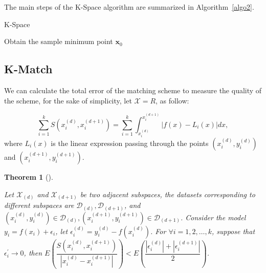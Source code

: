 \documentclass[sn-mathphys,Numbered]{sn-jnl}%
\theoremstyle{thmstyleone}%
\newtheorem{theorem}{Theorem}%
\theoremstyle{thmstyletwo}%
\theoremstyle{thmstylethree}%
\begin{document}
The main steps of the K-Space algorithm are summarized in Algorithm~\ref{algo2}.

\begin{algorithm}[H] 
	\caption{K-Space}
	\label{algo2}
	\BlankLine
	Obtain the sample minimum point $\boldsymbol{x}_0$

	
\end{algorithm}

\subsection{K-Match}\label{subsec3}

We can calculate the total error of the matching scheme to measure the quality of the scheme, for the sake of simplicity, let $\mathcal{X}=R$, as follow:

\begin{equation}
\sum\limits_{i=1}^k S(x_i^{(d)},x_i^{(d+1)})=\sum\limits_{i=1}^k\int_{x_i^{(d)}}^{x_i^{(d+1)}}|f(x)-L_i(x)|dx,\label{eq11}
\end{equation}
where $L_i(x)$ is the linear expression passing through the points $(x_i^{(d)},y_i^{{(d)}})$ and $(x_i^{(d+1)},y_i^{{(d+1)}})$. 

\begin{theorem}[]\label{thm1}

Let $\mathcal{X}_{(d)}$ and $\mathcal{X}_{(d+1)}$ be two adjacent subspaces, the datasets corresponding to different subspaces are $\mathcal{D}_{(d)},\mathcal{D}_{(d+1)}$, and $(x_i^{(d)},y_i^{(d)})\in\mathcal{D}_{(d)},(x_i^{(d+1)},y_i^{(d+1)})\in\mathcal{D}_{(d+1)}$. Consider the model $y_i=f(x_i)+\epsilon_i$, let $\epsilon_i^{(d)}=y_i^{(d)}-f(x_i^{(d)})$. For $\forall i=1,2,\ldots,k$, suppose that $\epsilon_i^\prime\rightarrow0$, then $E\left(\dfrac{S(x_i^{(d)},x_i^{{(d+1)}})}{|x_i^{(d)}-x_i^{(d+1)}|} \right)<E\left(\dfrac{|\epsilon_i^{(d)}|+|\epsilon_i^{{(d+1)}}|}{2} \right)$.

\end{theorem}
\end{document}

